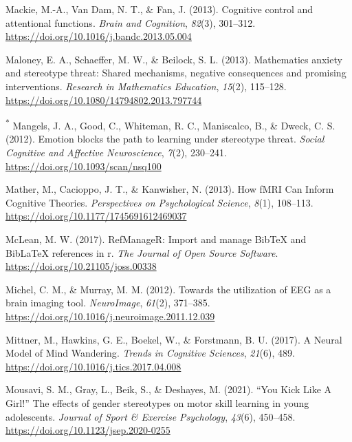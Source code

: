 \documentclass[
  stu, a4paper, 12pt,mask,floatsintext]{apa7}
\newlength{\cslhangindent}
\newenvironment{CSLReferences}[2] %
 {\begin{list}{}{%
  \setlength{\itemindent}{0pt}
  \setlength{\leftmargin}{0pt}
  \setlength{\parsep}{0pt}
  \ifodd #1
   \setlength{\leftmargin}{\cslhangindent}
   \setlength{\itemindent}{-1\cslhangindent}
  \fi
  \setlength{\itemsep}{#2\baselineskip}}}
 {\end{list}}
\begin{document}
\begin{CSLReferences}{1}{0}
Mackie, M.-A., Van Dam, N. T., \& Fan, J. (2013). Cognitive control and attentional functions. \emph{Brain and Cognition}, \emph{82}(3), 301--312. \url{https://doi.org/10.1016/j.bandc.2013.05.004}

Maloney, E. A., Schaeffer, M. W., \& Beilock, S. L. (2013). Mathematics anxiety and stereotype threat: Shared mechanisms, negative consequences and promising interventions. \emph{Research in Mathematics Education}, \emph{15}(2), 115--128. \url{https://doi.org/10.1080/14794802.2013.797744}

\textsuperscript{*} Mangels, J. A., Good, C., Whiteman, R. C., Maniscalco, B., \& Dweck, C. S. (2012). Emotion blocks the path to learning under stereotype threat. \emph{Social Cognitive and Affective Neuroscience}, \emph{7}(2), 230--241. \url{https://doi.org/10.1093/scan/nsq100}

Mather, M., Cacioppo, J. T., \& Kanwisher, N. (2013). How {fMRI Can Inform Cognitive Theories}. \emph{Perspectives on Psychological Science}, \emph{8}(1), 108--113. \url{https://doi.org/10.1177/1745691612469037}

McLean, M. W. (2017). RefManageR: Import and manage BibTeX and BibLaTeX references in r. \emph{The Journal of Open Source Software}. \url{https://doi.org/10.21105/joss.00338}

Michel, C. M., \& Murray, M. M. (2012). Towards the utilization of {EEG} as a brain imaging tool. \emph{NeuroImage}, \emph{61}(2), 371--385. \url{https://doi.org/10.1016/j.neuroimage.2011.12.039}

Mittner, M., Hawkins, G. E., Boekel, W., \& Forstmann, B. U. (2017). A {Neural Model} of {Mind Wandering}. \emph{Trends in Cognitive Sciences}, \emph{21}(6), 489. \url{https://doi.org/10.1016/j.tics.2017.04.008}

Mousavi, S. M., Gray, L., Beik, S., \& Deshayes, M. (2021). {``{You Kick Like A Girl}!''} The effects of gender stereotypes on motor skill learning in young adolescents. \emph{Journal of Sport \& Exercise Psychology}, \emph{43}(6), 450--458. \url{https://doi.org/10.1123/jsep.2020-0255}


\end{CSLReferences}
\end{document}
